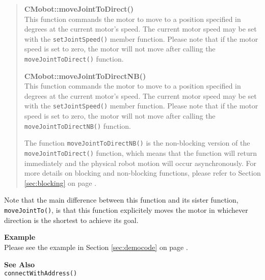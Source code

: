 \begin{quote}
{\bf CMobot::moveJointToDirect()}\\
This function commands the motor to move to a position specified in degrees at
the current motor's speed. The current motor speed may be set with the
\texttt{setJointSpeed()} member function. Please note that if the motor speed
is set to zero, the motor will not move after calling the
\texttt{moveJointToDirect()} function. 

{\bf CMobot::moveJointToDirectNB()}\\
This function commands the motor to move to a position specified in degrees at
the current motor's speed. The current motor speed may be set with the
\texttt{setJointSpeed()} member function. Please note that if the motor speed
is set to zero, the motor will not move after calling the
\texttt{moveJointToDirectNB()} function. 

The function \texttt{moveJointToDirectNB()} is the non-blocking version of
the \texttt{moveJointToDirect()} function, which means that the function will return
immediately and the physical robot motion will occur asynchronously. For
more details on blocking and non-blocking functions, please refer to 
Section \ref{sec:blocking} on page \pageref{sec:blocking}.\\
\end{quote}

Note that the main difference between this function and its sister function,
\texttt{moveJointTo()}, is that this function explicitely moves the motor in
whichever direction is the shortest to achieve its goal.

\noindent
{\bf Example}\\
Please see the example in Section \ref{sec:democode} on page \pageref{sec:democode}.\\
\noindent

\noindent
{\bf See Also}\\
\texttt{connectWithAddress()}

